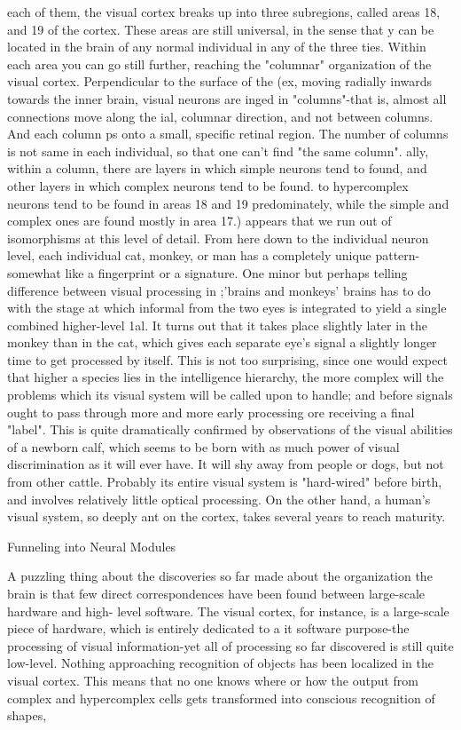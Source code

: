 each of them, the visual cortex breaks up into three subregions, called areas 18, and 19 of
the cortex. These areas are still universal, in the sense that y can be located in the brain of
any normal individual in any of the three ties. Within each area you can go still further,
reaching the "columnar" organization of the visual cortex. Perpendicular to the surface of
the (ex, moving radially inwards towards the inner brain, visual neurons are inged in
"columns"-that is, almost all connections move along the ial, columnar direction, and not
between columns. And each column ps onto a small, specific retinal region. The number
of columns is not same in each individual, so that one can't find "the same column". ally,
within a column, there are layers in which simple neurons tend to found, and other layers
in which complex neurons tend to be found. to hypercomplex neurons tend to be found in
areas 18 and 19 predominately, while the simple and complex ones are found mostly in
area 17.) appears that we run out of isomorphisms at this level of detail. From here down
to the individual neuron level, each individual cat, monkey, or man has a completely
unique pattern-somewhat like a fingerprint or a signature.
  One minor but perhaps telling difference between visual processing in ;'brains and
monkeys' brains has to do with the stage at which informal from the two eyes is
integrated to yield a single combined higher-level 1al. It turns out that it takes place
slightly later in the monkey than in the cat, which gives each separate eye's signal a
slightly longer time to get processed by itself. This is not too surprising, since one would
expect that higher a species lies in the intelligence hierarchy, the more complex will the
problems which its visual system will be called upon to handle; and before signals ought
to pass through more and more early processing ore receiving a final "label". This is quite
dramatically confirmed by observations of the visual abilities of a newborn calf, which
seems to be born with as much power of visual discrimination as it will ever have. It will
shy away from people or dogs, but not from other cattle. Probably its entire visual system
is "hard-wired" before birth, and involves relatively little optical processing. On the other
hand, a human's visual system, so deeply ant on the cortex, takes several years to reach
maturity.

                              Funneling into Neural Modules

  A puzzling thing about the discoveries so far made about the organization the brain is
that few direct correspondences have been found between large-scale hardware and high-
level software. The visual cortex, for instance, is a large-scale piece of hardware, which is
entirely dedicated to a it software purpose-the processing of visual information-yet all of
processing so far discovered is still quite low-level. Nothing approaching recognition of
objects has been localized in the visual cortex. This means that no one knows where or
how the output from complex and hypercomplex cells gets transformed into conscious
recognition of shapes,




